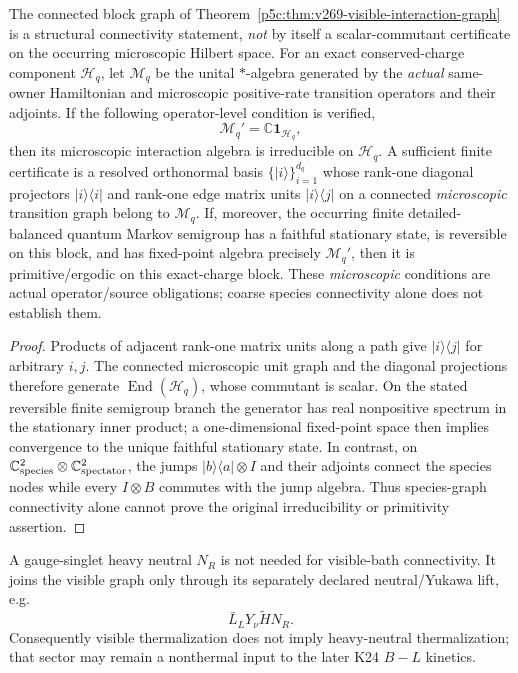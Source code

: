 \documentclass[12pt,a4paper]{article}
\begin{document}
\begin{corollary}
\label{p5c:cor:v269-visible-primitivity}
The connected block graph of Theorem~\ref{p5c:thm:v269-visible-interaction-graph}
is a structural connectivity statement, \emph{not} by itself a scalar-commutant
certificate on the occurring microscopic Hilbert space. For an exact
conserved-charge component \(\mathcal H_q\), let \(\mathcal M_q\) be the
unital \(*\)-algebra generated by the \emph{actual} same-owner Hamiltonian
and microscopic positive-rate transition operators and their adjoints.
If the following operator-level condition is verified,
\[
 \boxed{\mathcal M_q'=\mathbb C\mathbf1_{\mathcal H_q}},
\]
then its microscopic interaction algebra is irreducible on \(\mathcal H_q\).
A sufficient finite certificate is a resolved orthonormal basis
\(\{|i\rangle\}_{i=1}^{d_q}\) whose rank-one diagonal projectors
\(|i\rangle\langle i|\) and rank-one edge matrix units
\(|i\rangle\langle j|\) on a connected \emph{microscopic} transition graph
belong to \(\mathcal M_q\). If, moreover, the occurring finite
detailed-balanced quantum Markov semigroup has a faithful stationary state,
is reversible on this block, and has fixed-point algebra precisely
\(\mathcal M_q'\), then it is primitive/ergodic on this exact-charge block.
These \emph{microscopic} conditions are actual operator/source obligations;
coarse species connectivity alone does not establish them.
\end{corollary}
\begin{proof}
Products of adjacent rank-one matrix units along a path give
\(|i\rangle\langle j|\) for arbitrary \(i,j\). The connected microscopic
unit graph and the diagonal projections therefore generate
\(\operatorname{End}(\mathcal H_q)\), whose commutant is scalar. On the
stated reversible finite semigroup branch the generator has real
nonpositive spectrum in the stationary inner product; a one-dimensional
fixed-point space then implies convergence to the unique faithful
stationary state. In contrast, on
\(\mathbb C^2_{\rm species}\otimes\mathbb C^2_{\rm spectator}\), the jumps
\(|b\rangle\langle a|\otimes I\) and their adjoints connect the species
nodes while every \(I\otimes B\) commutes with the jump algebra. Thus
species-graph connectivity alone cannot prove the original irreducibility
or primitivity assertion.
\end{proof}

\begin{remark}
\label{p5c:rem:v269-heavy-neutral-firewall}
A gauge-singlet heavy neutral $N_R$ is not needed for visible-bath
connectivity.  It joins the visible graph only through its separately declared
neutral/Yukawa lift, e.g.
\[
 \bar L_LY_\nu\widetilde HN_R.
\]
Consequently visible thermalization does not imply heavy-neutral thermalization;
that sector may remain a nonthermal input to the later K24 $B-L$ kinetics.
\end{remark}
\end{document}

